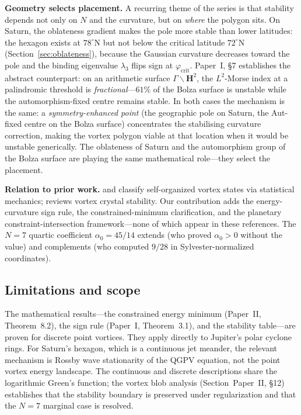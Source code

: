 \smallskip\noindent\textbf{Geometry selects placement.}
A recurring theme of the series is that stability depends not
only on $N$ and the curvature, but on \emph{where} the polygon
sits.  On Saturn, the oblateness gradient makes the pole more
stable than lower latitudes: the hexagon exists at
$78^\circ$N but not below the critical latitude
$72^\circ$N (Section~\ref{sec:oblateness}), because the
Gaussian curvature decreases toward the pole and the binding
eigenvalue $\lambda_3$ flips sign at $\varphi_{\mathrm{crit}}$.
Paper~I, \S7 establishes the abstract counterpart:
on an arithmetic surface
$\Gamma\backslash\mathbf{H}^2$, the $L^2$-Morse index at
a palindromic threshold is \emph{fractional}---$61\%$ of the
Bolza surface is unstable while the automorphism-fixed centre
remains stable.
In both cases the mechanism is the same: a
\emph{symmetry-enhanced point} (the geographic pole on Saturn,
the Aut-fixed centre on the Bolza surface) concentrates the
stabilising curvature correction, making the vortex polygon
viable at that location when it would be unstable generically.
The oblateness of Saturn and the automorphism group of the
Bolza surface are playing the same mathematical role---they
select the placement.

\smallskip\noindent\textbf{Relation to prior work.}
\citet{BouchetVenaille2012} and \citet{ChavanisSommeria1996} classify
self-organized vortex states via statistical mechanics;
\citet{Aref2003} reviews vortex crystal stability.
Our contribution adds the energy-curvature sign rule, the
constrained-minimum clarification, and the planetary
constraint-intersection framework---none of which appear in
these references.  The $N = 7$ quartic coefficient $\alpha_0 = 45/14$
extends \citet{KurakinYudovich2002} (who proved $\alpha_0 > 0$
without the value) and complements \citet{Schmidt2004} (who computed
$9/28$ in Sylvester-normalized coordinates).


\subsection{Limitations and scope}

The mathematical results---the constrained energy minimum
(Paper~II, Theorem~8.2), the sign rule
(Paper~I, Theorem~3.1), and the stability table---are proven
for discrete point vortices.  They apply directly to Jupiter's polar
cyclone rings.  For Saturn's hexagon, which is a continuous jet meander,
the relevant mechanism is Rossby wave stationarity of the QGPV
equation, not the point vortex energy landscape.  The continuous and
discrete descriptions share the logarithmic Green's function; the
vortex blob analysis (Section~Paper~II, \S12) establishes that the
stability boundary is preserved under regularization and that the
$N = 7$ marginal case is resolved.

